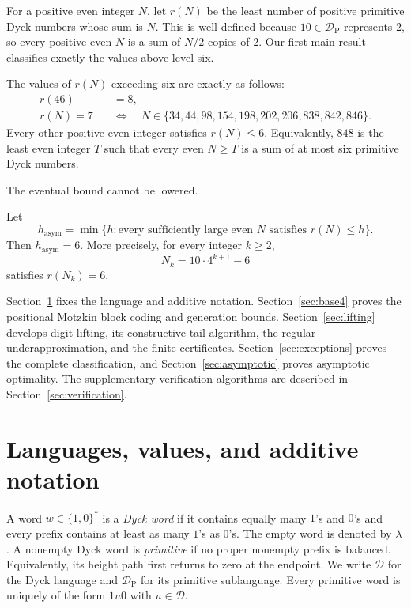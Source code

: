 \documentclass{ws-ijfcs}
\newcommand{\Dyck}{\mathcal{D}}
\newcommand{\DP}{\mathcal{D}_{\mathrm{P}}}
\begin{document}
For a positive even integer $N$, let $r(N)$ be the least number of positive
primitive Dyck numbers whose sum is $N$.  This is well defined because
$10\in\DP$ represents $2$, so every positive even $N$ is a sum of $N/2$
copies of $2$.  Our first main result classifies exactly the values above
level six.

\begin{theorem}\label{thm:classification}
The values of $r(N)$ exceeding six are exactly as follows:
\[
\begin{aligned}
 r(46)&=8,\\[4pt]
 r(N)=7\quad&\Longleftrightarrow\quad
 N\in\{34,44,98,154,198,202,206,838,842,846\}.
\end{aligned}
\]
Every other positive even integer satisfies $r(N)\leq6$.  Equivalently,
$848$ is the least even integer $T$ such that every even $N\geq T$ is a
sum of at most six primitive Dyck numbers.
\end{theorem}

The eventual bound cannot be lowered.

\begin{theorem}\label{thm:asymptotic-order}
Let
\[
 h_{\mathrm{asym}}
 =\min\{h:\text{every sufficiently large even }N
              \text{ satisfies }r(N)\leq h\}.
\]
Then $h_{\mathrm{asym}}=6$.  More precisely, for every integer $k\geq2$,
\[
 N_k=10\cdot4^{k+1}-6
\]
satisfies $r(N_k)=6$.
\end{theorem}

Section~\ref{sec:preliminaries} fixes the language and additive notation.
Section~\ref{sec:base4} proves the positional Motzkin block coding and
generation bounds.  Section~\ref{sec:lifting} develops digit lifting, its
constructive tail algorithm, the regular underapproximation, and the finite
certificates.  Section~\ref{sec:exceptions}
proves the complete classification, and Section~\ref{sec:asymptotic}
proves asymptotic optimality.  The supplementary verification algorithms
are described in Section~\ref{sec:verification}.

\section{Languages, values, and additive notation}\label{sec:preliminaries}

A word $w\in\{1,0\}^*$ is a \emph{Dyck word} if it contains equally many
$1$'s and $0$'s and every prefix contains at least as many $1$'s as
$0$'s.  The empty word is denoted by $\lambda$.  A nonempty Dyck word is
\emph{primitive} if no proper nonempty prefix is balanced.  Equivalently,
its height path first returns to zero at the endpoint.  We write $\Dyck$
for the Dyck language and $\DP$ for its primitive sublanguage.  Every
primitive word is uniquely of the form $1u0$ with $u\in\Dyck$.
\end{document}
